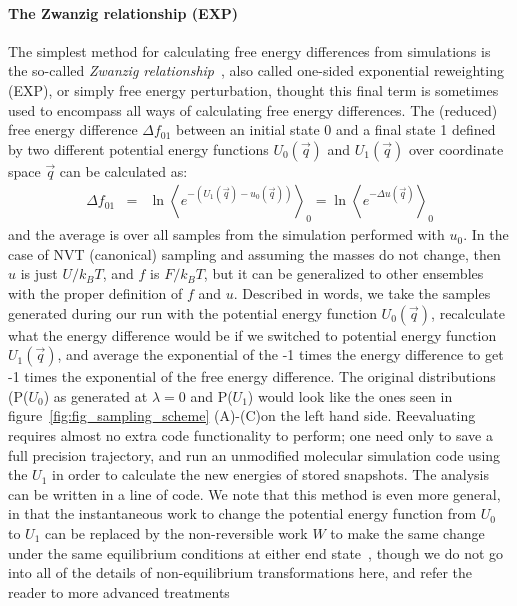 \documentclass[9pt,bestpractices]{livecoms}
\newcommand{\expect}[1]{\left\langle{#1}\right\rangle}
\begin{document}
\paragraph{The Zwanzig relationship (EXP)}
%
The simplest method for calculating free energy differences from simulations is the so-called \textit{Zwanzig
relationship}~\cite{zwanzig1954hightemperature}, also called one-sided exponential reweighting (EXP), or simply free energy perturbation, thought this final term is sometimes used to encompass all ways of calculating free energy differences.
%
The (reduced) free energy difference $\Delta f_{01}$ between an initial state 0 and a final state 1 defined by two different potential energy functions 
$U_0(\vec{q})$ and $U_1(\vec{q})$ over coordinate space $\vec{q}$ can be calculated as:
\begin{eqnarray}
\Delta f_{01} & = & \ln \expect{e^{-(U_1(\vec{q}) - u_0(\vec{q}))}}_0 =  \ln \expect{e^{-\Delta u(\vec{q})} }_0
\end{eqnarray}\label{eqn.zwanzig}
and the average is over all samples from the simulation performed with $u_0$. In the case of NVT (canonical) sampling and assuming the masses do not change, then $u$ is just $U/k_BT$, and $f$ is $F/k_BT$, but it can be generalized to other ensembles with the proper definition of $f$ and $u$.
Described in words, we take the samples generated during our run with the potential energy function $U_0(\vec{q})$, recalculate what the energy difference would be if we switched to potential energy function $U_1(\vec{q})$, and average the exponential of the -1 times the energy difference to get -1 times the exponential of the free energy difference. The original distributions (P($U_0$) as generated at $\lambda=0$ and P($U_1$) would look like the ones seen in figure~\ref{fig:fig_sampling_scheme} (A)-(C)on the left hand side. Reevaluating  requires almost no extra code functionality to perform; one need only to save a full precision trajectory, and run an unmodified molecular simulation code using the $U_1$ in order to calculate the new energies of stored snapshots. The analysis can be written in a line of code.  We note that this method is even more general, in that the instantaneous work to change the potential energy function from $U_0$ to $U_1$ can be replaced by the non-reversible work $W$ to make the same change under the same equilibrium conditions at either end state~\cite{jarzynski1997nonequilibrium,jarzynski1998equilibrium,crooks2000pathensemble}, though we do not go into all of the details of non-equilibrium transformations here, and refer the reader to more advanced treatments~\cite{maragakis2008bayesian,oberhofer2005biased,procacci2015unbiased,shirts2003equilibriuma,ytreberg2004singleensemble}
\end{document}
